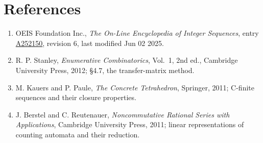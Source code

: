 \documentclass[11pt]{article}
\theoremstyle{definition}
\begin{document}
\section{References}

\begin{enumerate}

\item OEIS Foundation Inc., \emph{The On-Line Encyclopedia of Integer Sequences}, entry \href{https://oeis.org/A252150}{A252150}, revision 6, last modified Jun 02 2025.

\item R. P. Stanley, \emph{Enumerative Combinatorics}, Vol.~1, 2nd ed., Cambridge University Press, 2012; \S4.7, the transfer-matrix method.

\item M. Kauers and P. Paule, \emph{The Concrete Tetrahedron}, Springer, 2011; C-finite sequences and their closure properties.

\item J. Berstel and C. Reutenauer, \emph{Noncommutative Rational Series with Applications}, Cambridge University Press, 2011; linear representations of counting automata and their reduction.

\end{enumerate}
\end{document}
